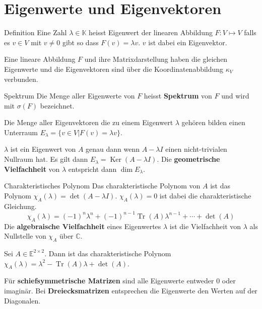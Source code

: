 \documentclass[a4paper,10pt]{article}
\DeclareMathOperator{\Tr}{Tr}
\DeclareMathOperator{\Kernel}{Ker}
\def\C{\mathbb{C}}
\def\E{\mathbb{E}}
\def\K{\mathbb{K}}
\begin{document}
\section{Eigenwerte und Eigenvektoren}

\begin{mainbox}{Definition}
  Eine Zahl $\lambda \in \K$ heisst Eigenwert der linearen Abbildung $F: V \mapsto V$ falls es $v \in V$ mit $v \neq 0$ gibt so dass $F(v) = \lambda v$. $v$ ist dabei ein Eigenvektor. 
\end{mainbox}

Eine lineare Abbildung $F$ und ihre Matrixdarstellung haben die gleichen Eigenwerte und die Eigenvektoren sind über die Koordinatenabbildung $\kappa_V$ verbunden.

\begin{subbox}{Spektrum}
  Die Menge aller Eigenwerte von $F$ heisst \textbf{Spektrum} von $F$ und wird mit $\sigma(F)$ bezeichnet.
\end{subbox}

Die Menge aller Eigenvektoren die zu einem Eigenwert $\lambda$ gehören bilden einen Unterraum $E_\lambda = \{ v \in V | F(v) = \lambda v \}$.

$\lambda$ ist ein Eigenwert von $A$ genau dann wenn $A - \lambda I$ einen nicht-trivialen Nullraum hat. Es gilt dann $E_\lambda = \Kernel(A - \lambda I)$. Die \textbf{geometrische Vielfachheit} von $\lambda$ entspricht dann $\dim E_\lambda$.

\begin{subbox}{Charakteristisches Polynom}
  Das charakteristische Polynom von $A$ ist das Polynom $\chi_A(\lambda) = \det(A - \lambda I)$. $\chi_A(\lambda) = 0$ ist dabei die charakteristische Gleichung.
  $$\chi_A(\lambda) = (-1)^n \lambda^n + (-1)^{n-1} \Tr(A) \lambda^{n-1} + \cdots + \det(A)$$
  Die \textbf{algebraische Vielfachheit} eines Eigenwertes $\lambda$ ist die Vielfachheit von $\lambda$ als Nullstelle von $\chi_A$ über $\C$.
\end{subbox}

Sei $A \in \E^{2 \times 2}$. Dann ist das charakteristische Polynom $\chi_A(\lambda) = \lambda^2 - \Tr(A) \lambda + \det(A)$.

Für \textbf{schiefsymmetrische Matrizen} sind alle Eigenwerte entweder $0$ oder imaginär. Bei \textbf{Dreiecksmatrizen} entsprechen die Eigenwerte den Werten auf der Diagonalen.
\end{document}
